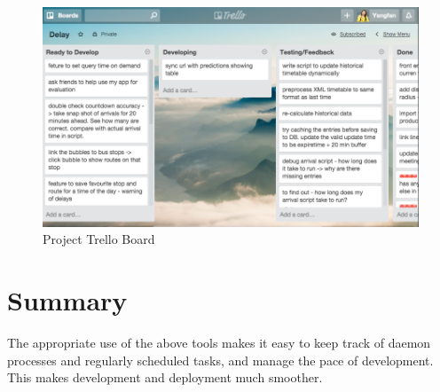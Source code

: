 \begin{figure}
\centering
\includegraphics[width=\textwidth]{figures/trello_small.png}
\caption{\label{fig:trello} Project Trello Board}
\end{figure}

\section{Summary}
\par The appropriate use of the above tools makes it easy to keep track of daemon processes and regularly scheduled tasks, and manage the pace of development. This makes development and deployment much smoother.
